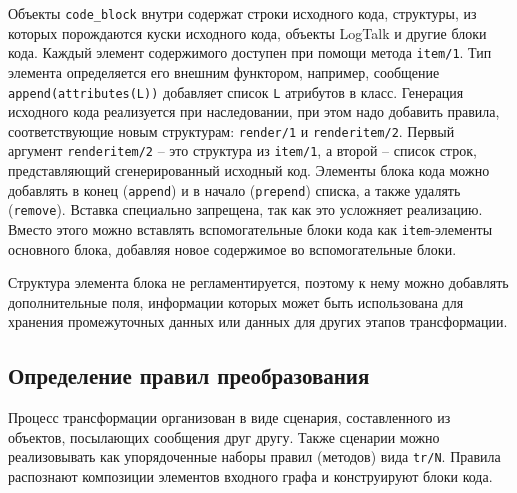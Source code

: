 \documentclass[conference]{IEEEtran} \IEEEoverridecommandlockouts
\begin{document}
Объекты \verb|code_block| внутри содержат строки исходного кода, структуры, из которых порождаются куски исходного кода, объекты LogTalk и другие блоки кода. Каждый элемент содержимого доступен при помощи метода \verb|item/1|. Тип элемента определяется его внешним функтором, например, сообщение \verb|append(attributes(L))| добавляет список \verb|L| атрибутов в класс. Генерация исходного кода реализуется при наследовании, при этом надо добавить правила, соответствующие новым структурам: \verb|render/1| и \verb|renderitem/2|. Первый аргумент \verb|renderitem/2| -- это структура из \verb|item/1|, а второй -- список строк, представляющий сгенерированный исходный код. Элементы блока кода можно добавлять в конец (\verb|append|) и в начало (\verb|prepend|) списка, а также удалять (\verb|remove|). Вставка специально запрещена, так как это усложняет реализацию. Вместо этого можно вставлять вспомогательные блоки кода как \verb|item|-элементы основного блока, добавляя новое содержимое во вспомогательные блоки. 

Структура элемента блока не регламентируется, поэтому к нему можно добавлять дополнительные поля, информации которых может быть использована для хранения промежуточных данных или данных для других этапов трансформации. 

\subsection{Определение правил преобразования} \label{sec:mda-rules} 

Процесс трансформации организован в виде сценария, составленного из объектов, посылающих сообщения друг другу. Также сценарии можно реализовывать как упорядоченные наборы правил (методов) вида \verb|tr/N|. Правила распознают композиции элементов входного графа и конструируют блоки кода. 
\end{document}
